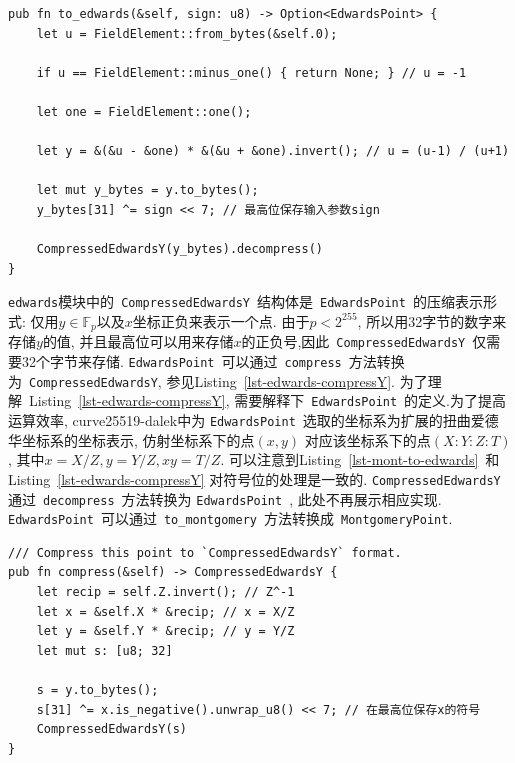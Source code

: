 \documentclass{article}
\newcommand{\F}{\mathbb{F}}
\newcommand{\code}[1]{\lstinline!#1!}
\begin{document}
\begin{lstlisting}[caption=\code{MontgomeryPoint}的~\code{to_edwards}~实现, label=lst-mont-to-edwards]
pub fn to_edwards(&self, sign: u8) -> Option<EdwardsPoint> {
    let u = FieldElement::from_bytes(&self.0);
    
    if u == FieldElement::minus_one() { return None; } // u = -1
    
    let one = FieldElement::one();
    
    let y = &(&u - &one) * &(&u + &one).invert(); // u = (u-1) / (u+1)

    let mut y_bytes = y.to_bytes();
    y_bytes[31] ^= sign << 7; // 最高位保存输入参数sign

    CompressedEdwardsY(y_bytes).decompress()
}
\end{lstlisting}

\code{edwards}模块中的~\code{CompressedEdwardsY}~结构体是~\code{EdwardsPoint}~的压缩表示形式:
仅用$y\in\F_p$以及$x$坐标正负来表示一个点. 由于$p < 2^{255}$, 所以用32字节的数字来存储$y$的值,
并且最高位可以用来存储$x$的正负号,因此~\code{CompressedEdwardsY}~仅需要32个字节来存储.
\code{EdwardsPoint}~可以通过~\code{compress}~方法转换为~\code{CompressedEdwardsY},
参见Listing~\ref{lst-edwards-compressY}. 为了理解~Listing~\ref{lst-edwards-compressY},
需要解释下~\code{EdwardsPoint}~的定义.为了提高运算效率,  \textsf{curve25519-dalek}中为
\code{EdwardsPoint}~选取的坐标系为扩展的扭曲爱德华坐标系的坐标表示, 仿射坐标系下的点$(x,y)$
对应该坐标系下的点$(X:Y:Z:T)$, 其中$x = X/Z, y = Y/Z, xy = T/Z$.
可以注意到Listing~\ref{lst-mont-to-edwards}~和Listing~\ref{lst-edwards-compressY}
对符号位的处理是一致的. \code{CompressedEdwardsY}通过~\code{decompress}~方法转换为
\code{EdwardsPoint}~, 此处不再展示相应实现.
\code{EdwardsPoint}~可以通过~\code{to_montgomery}~方法转换成~\code{MontgomeryPoint}.

\begin{lstlisting}[caption=\code{EdwardsPoint}的~\code{compress}~实现, label=lst-edwards-compressY]
/// Compress this point to `CompressedEdwardsY` format.
pub fn compress(&self) -> CompressedEdwardsY {
    let recip = self.Z.invert(); // Z^-1
    let x = &self.X * &recip; // x = X/Z
    let y = &self.Y * &recip; // y = Y/Z
    let mut s: [u8; 32]
    
    s = y.to_bytes();
    s[31] ^= x.is_negative().unwrap_u8() << 7; // 在最高位保存x的符号
    CompressedEdwardsY(s)
}
\end{lstlisting}
\end{document}

